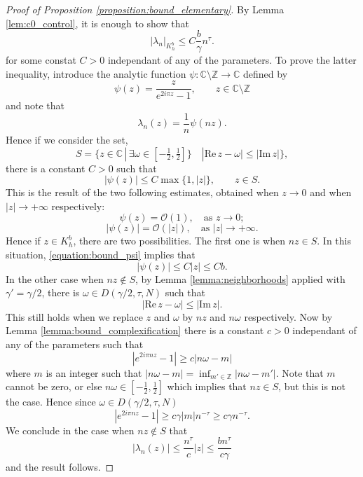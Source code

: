 \documentclass[10pt]{article}
\newcommand{\Z}{\mathbb{Z}}
\newcommand{\C}{\mathbb{C}}
\newcommand{\re}{\text{Re}\,}
\newcommand{\im}{\text{Im}\,}
\begin{document}
\begin{proof}[Proof of Proposition \ref{proposition:bound_elementary}]
    By Lemma \ref{lem:c0_control}, it is enough to show that
    \[
    |\lambda_n|_{K_h^b}\leq C\frac{b}{\gamma}n^{\tau}.
    \]
    for some constat $C>0$ independant of any of the parameters.
    To prove the latter inequality, introduce the analytic function $\psi:\C\setminus\Z\to\C$ defined by 
    \[
        \psi(z) = \frac{z}{e^{2i\pi z}-1},
        \qquad z\in\C\setminus\Z
    \]
    and note that 
    \[
    \lambda_n(z) = \frac{1}{n}\psi(nz).
    \]
    Hence if we consider the set,
    \[
    S = \{z\in\C
    \,|\,
    \exists\omega\in[-\tfrac{1}{2},\tfrac{1}{2}]\}
    \quad 
    |\re z-\omega|\leq|\im z|\},
    \]
    there is a constant $C>0$ such that 
    \begin{equation}
    \label{equation:bound_psi}
    |\psi(z)|\leq C\max\{ 1, |z|\},
    \qquad z\in S.
    \end{equation}
    This is the result of the two following estimates, obtained when $z\to 0$ and when $|z|\to+\infty$ respectively:
    \[
    \psi(z) = \mathcal O(1),\quad \text{as }z\to0;
    \]
    \[
    |\psi(z)| = \mathcal O(|z|),\quad \text{as }|z|\to+\infty.
    \]
    Hence if $z\in K_h^b$, there are two possibilities. The first one is when $nz\in S$. In this situation, \ref{equation:bound_psi} implies that 
    \[
    |\psi(z)|\leq C|z|\leq Cb.
    \]
    In the other case when $nz\notin S$, by Lemma \ref{lemma:neighborhoods} applied with $\gamma'=\gamma/2$, there is $\omega\in D(\gamma/2,\tau,N)$ such that
    \[
    |\re z-\omega|\leq|\im z|. 
    \]
    This still holds when we replace $z$ and $\omega$ by $nz$ and $n\omega$ respectively. Now by Lemma \ref{lemma:bound_complexification} there is
    a constant $c>0$ independant of any of the parameters such that 
    \[
    |e^{2i\pi n z}-1|\geq c|n\omega-m|
    \]
    where $m$ is an integer such that $|n\omega-m| = \inf_{m'\in\Z}|n\omega-m'|$. Note that $m$ cannot be zero, or else $n\omega\in[-\tfrac{1}{2},\tfrac{1}{2}]$ which implies that $nz\in S$, but this is not the case.
    Hence since $\omega\in D(\gamma/2,\tau,N)$
    \[
    |e^{2i\pi n z}-1|\geq c\gamma|m|n^{-\tau}\geq c\gamma n^{-\tau}.
    \]
    We conclude in the case when $nz\notin S$ that
    \[
    |\lambda_n(z)|\leq \frac{n^{\tau}}{c}|z|\leq \frac{bn^{\tau}}{c\gamma}
    \]
    and the result follows.
\end{proof}
\end{document}

